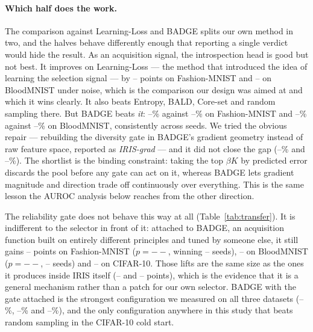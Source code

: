 \documentclass[a4paper,fleqn,longmktitle]{cas-sc}
\newcommand{\method}{IRIS}
\providecommand{\FmnistNoisyIrisFinal}{--}\providecommand{\FmnistNoisyIrisFinalStd}{--}
\providecommand{\BloodNoisyIrisFinal}{--}\providecommand{\BloodNoisyIrisFinalStd}{--}
\providecommand{\CifarNoisyIrisNorelFinal}{--}\providecommand{\CifarNoisyIrisNorelFinalStd}{--}
\providecommand{\FmnistRelOnIrisGain}{--}\providecommand{\FmnistRelOnBadgeGain}{--}\providecommand{\FmnistRelOnBadgeP}{--}\providecommand{\FmnistRelOnBadgeWon}{--}\providecommand{\FmnistNoisyBadgeFinal}{--}\providecommand{\FmnistNoisyBadgeRelFinal}{--}\providecommand{\FmnistNoisyIrisNorelFinal}{--}\providecommand{\FmnistNoisyLearnlossGap}{--}\providecommand{\FmnistNoisyIrisGradFinal}{--}\providecommand{\FmnistNoisyLearnlossFinal}{--}\providecommand{\BloodRelOnIrisGain}{--}\providecommand{\BloodRelOnBadgeGain}{--}\providecommand{\BloodRelOnBadgeP}{--}\providecommand{\BloodRelOnBadgeWon}{--}\providecommand{\BloodNoisyBadgeFinal}{--}\providecommand{\BloodNoisyBadgeRelFinal}{--}\providecommand{\BloodNoisyIrisNorelFinal}{--}\providecommand{\BloodNoisyLearnlossGap}{--}\providecommand{\BloodNoisyIrisGradFinal}{--}\providecommand{\BloodNoisyLearnlossFinal}{--}\providecommand{\CifarRelOnIrisGain}{--}\providecommand{\CifarRelOnBadgeGain}{--}\providecommand{\CifarRelOnBadgeP}{--}\providecommand{\CifarRelOnBadgeWon}{--}\providecommand{\CifarNoisyBadgeFinal}{--}\providecommand{\CifarNoisyBadgeRelFinal}{--}\providecommand{\CifarNoisyIrisNorelFinal}{--}\providecommand{\CifarNoisyLearnlossGap}{--}\providecommand{\CifarNoisyIrisGradFinal}{--}\providecommand{\CifarNoisyLearnlossFinal}{--}
\begin{document}
\paragraph{Which half does the work.} The comparison against
Learning-Loss and BADGE splits our own method in two, and the halves
behave differently enough that reporting a single verdict would hide
the result. As an acquisition signal, the introspection head is good
but not best. It improves on Learning-Loss --- the method that
introduced the idea of learning the selection signal --- by
\FmnistNoisyLearnlossGap{} points on Fashion-MNIST and
\BloodNoisyLearnlossGap{} on BloodMNIST under noise, which is the
comparison our design was aimed at and which it wins clearly. It also
beats Entropy, BALD, Core-set and random sampling there. But BADGE
beats \emph{it}: \FmnistNoisyBadgeFinal\% against
\FmnistNoisyIrisFinal\% on Fashion-MNIST and \BloodNoisyBadgeFinal\%
against \BloodNoisyIrisFinal\% on BloodMNIST, consistently across
seeds. We tried the obvious repair --- rebuilding the diversity gate in
BADGE's gradient geometry instead of raw feature space, reported as
\emph{\method{}-grad} --- and it did not close the gap
(\FmnistNoisyIrisGradFinal\% and \BloodNoisyIrisGradFinal\%). The
shortlist is the binding constraint: taking the top $\beta K$ by
predicted error discards the pool before any gate can act on it,
whereas BADGE lets gradient magnitude and direction trade off
continuously over everything. This is the same lesson the AUROC
analysis below reaches from the other direction.

The reliability gate does not behave this way at all
(Table~\ref{tab:transfer}). It is indifferent to the selector in front
of it: attached to BADGE, an
acquisition function built on entirely different principles and tuned
by someone else, it still gains \FmnistRelOnBadgeGain{} points on
Fashion-MNIST ($p=\FmnistRelOnBadgeP$, winning
\FmnistRelOnBadgeWon{} seeds), \BloodRelOnBadgeGain{} on BloodMNIST
($p=\BloodRelOnBadgeP$, \BloodRelOnBadgeWon{} seeds) and
\CifarRelOnBadgeGain{} on CIFAR-10. Those lifts are the same size as
the ones it produces inside \method{} itself
(\FmnistRelOnIrisGain{} and \BloodRelOnIrisGain{} points), which is
the evidence that it is a general mechanism rather than a patch for our
own selector. BADGE with the gate attached is the strongest
configuration we measured on all three datasets
(\FmnistNoisyBadgeRelFinal\%, \BloodNoisyBadgeRelFinal\% and
\CifarNoisyBadgeRelFinal\%), and the only configuration anywhere in
this study that beats random sampling in the CIFAR-10 cold start.
\end{document}
